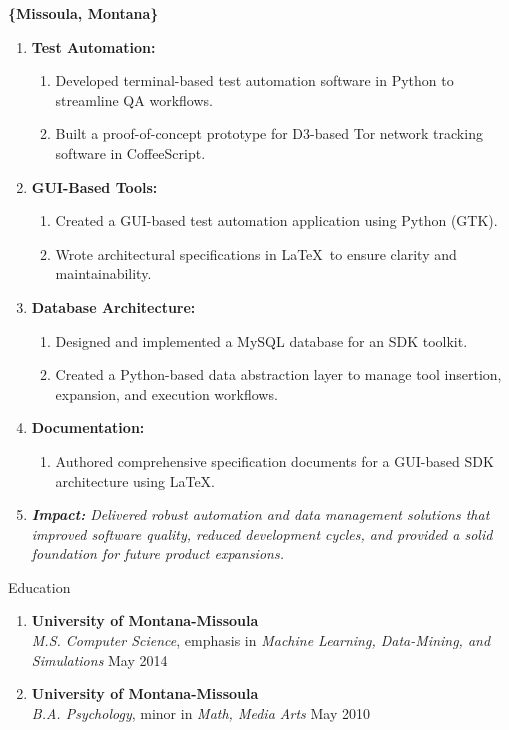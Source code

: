\documentclass[oneside]{article}%
\begin{document}
\begin{enumerate}[]
	\textbf{\{Missoula, Montana\}}
	\begin{enumerate}[]
		\item \textbf{Test Automation:}
			\begin{enumerate}[-]
				\item Developed terminal-based test automation software in Python to streamline QA workflows.
				\item Built a proof-of-concept prototype for D3-based Tor network tracking software in CoffeeScript.
			\end{enumerate}
		\item \textbf{GUI-Based Tools:}
			\begin{enumerate}[-]
				\item Created a GUI-based test automation application using Python (GTK).
				\item Wrote architectural specifications in \LaTeX\ to ensure clarity and maintainability.
			\end{enumerate}
		\item \textbf{Database Architecture:}
			\begin{enumerate}[-]
				\item Designed and implemented a MySQL database for an SDK toolkit.
				\item Created a Python-based data abstraction layer to manage tool insertion, expansion, and execution workflows.
			\end{enumerate}
		\item \textbf{Documentation:}
			\begin{enumerate}[-]
				\item Authored comprehensive specification documents for a GUI-based SDK architecture using \LaTeX.
			\end{enumerate}
	\item \textit{\textbf{Impact:} Delivered robust automation and data management solutions that improved software quality, reduced development cycles, 
	and provided a solid foundation for future product expansions.}
	\end{enumerate}
\end{enumerate}
\newpage

\noindent
\huge{Education}
\small
\begin{enumerate}[]
\item \textbf{University of Montana-Missoula}\\
	\textit{M.S. Computer Science}, emphasis in \textit{Machine Learning, Data-Mining, and Simulations} \hfill May 2014
\item \textbf{University of Montana-Missoula}\\
	\textit{B.A. Psychology}, minor in \textit{Math, Media Arts} \hfill May 2010
	\
\end{enumerate}
\
\end{document}
